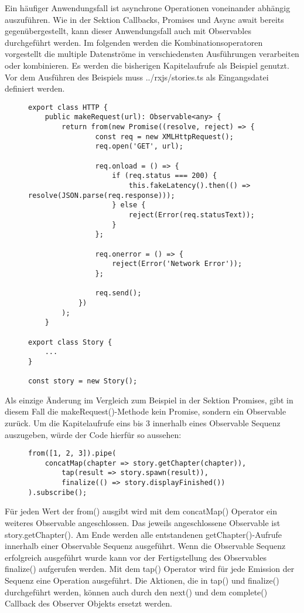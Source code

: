 \noindent
Ein häufiger Anwendungsfall ist asynchrone Operationen voneinander abhängig auszuführen. Wie in der Sektion Callbacks, Promises und Async await bereits gegenübergestellt, kann dieser Anwendungsfall auch mit Observables durchgeführt werden. Im folgenden werden die Kombinationsoperatoren vorgestellt die multiple Datenströme in verschiedensten Ausführungen verarbeiten oder kombinieren. Es werden die bisherigen Kapitelaufrufe als Beispiel genutzt. Vor dem Ausführen des Beispiels muss ../rxjs/stories.ts als Eingangsdatei definiert werden.

\begin{figure}[H]
\begin{lstlisting}[basicstyle=\small]
export class HTTP {
    public makeRequest(url): Observable<any> {
        return from(new Promise((resolve, reject) => {
                const req = new XMLHttpRequest();
                req.open('GET', url);

                req.onload = () => {
                    if (req.status === 200) {
                        this.fakeLatency().then(() => resolve(JSON.parse(req.response)));
                    } else {
                        reject(Error(req.statusText));
                    }
                };

                req.onerror = () => {
                    reject(Error('Network Error'));
                };

                req.send();
            })
        );
    }

export class Story {
    ...
}

const story = new Story();
\end{lstlisting}
\end{figure}

\noindent
Als einzige Änderung im Vergleich zum Beispiel in der Sektion Promises, gibt in diesem Fall die makeRequest()-Methode kein Promise, sondern ein Observable zurück. Um die Kapitelaufrufe eins bis 3 innerhalb eines Observable Sequenz auszugeben, würde der Code hierfür so aussehen:
\begin{figure}[H]
\begin{lstlisting}[basicstyle=\small]
from([1, 2, 3]).pipe(
    concatMap(chapter => story.getChapter(chapter)),
        tap(result => story.spawn(result)),
        finalize(() => story.displayFinished())
).subscribe();
\end{lstlisting}
\end{figure}

\noindent
Für jeden Wert der from() ausgibt wird mit dem concatMap() Operator ein weiteres Observable angeschlossen. Das jeweils angeschlossene Observable ist story.getChapter(). Am Ende werden alle entstandenen getChapter()-Aufrufe innerhalb einer Observable Sequenz ausgeführt. Wenn die Observable Sequenz erfolgreich ausgeführt wurde kann vor der Fertigstellung des Observables finalize() aufgerufen werden. Mit dem tap() Operator wird für jede Emission der Sequenz eine Operation ausgeführt. Die Aktionen, die in tap() und finalize() durchgeführt werden, können auch durch den next() und dem complete() Callback des Observer Objekts ersetzt werden.\\


